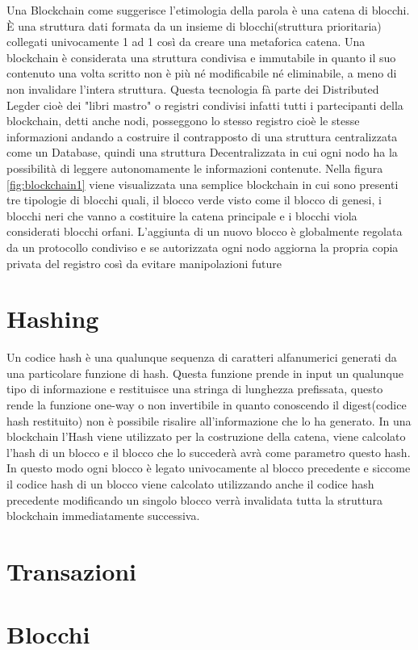 \documentclass[a4paper]{report}
\begin{document}
Una Blockchain come suggerisce l'etimologia della parola è una catena di blocchi. È una struttura dati formata da un insieme di blocchi(struttura prioritaria) collegati univocamente 1 ad 1 così da creare una metaforica catena. Una blockchain è considerata una struttura condivisa e immutabile in quanto il suo contenuto una volta scritto non è più né modificabile né eliminabile, a meno di non invalidare l'intera struttura. Questa tecnologia fà parte dei Distributed Legder cioè dei "libri mastro" o registri condivisi infatti tutti i partecipanti della blockchain, detti anche nodi, posseggono lo stesso registro cioè le stesse informazioni andando a costruire il contrapposto di una struttura centralizzata come un Database, quindi una struttura Decentralizzata in cui ogni nodo ha la possibilità di leggere autonomamente le informazioni contenute.
Nella figura \ref{fig:blockchain1} viene visualizzata una semplice blockchain in cui sono presenti tre tipologie di blocchi quali, il blocco verde visto come il blocco di genesi, i blocchi neri che vanno a costituire la catena principale e i blocchi viola considerati blocchi orfani. L'aggiunta di un nuovo blocco è globalmente regolata da un protocollo condiviso e se autorizzata ogni nodo aggiorna la propria copia privata del registro così da evitare manipolazioni future
\section{Hashing}
Un codice hash è una qualunque sequenza di caratteri alfanumerici generati da una particolare funzione di hash. Questa funzione prende in input un qualunque tipo di informazione e restituisce una stringa di lunghezza prefissata, questo rende la funzione one-way o non invertibile in quanto conoscendo il digest(codice hash restituito) non è possibile risalire all'informazione che lo ha generato. In una blockchain l'Hash viene utilizzato per la costruzione della catena, viene calcolato l'hash di un blocco e il blocco che lo succederà avrà come parametro questo hash. In questo modo ogni blocco è legato univocamente al blocco precedente e siccome il codice hash di un blocco viene calcolato utilizzando anche il codice hash precedente modificando un singolo blocco verrà invalidata tutta la struttura blockchain immediatamente successiva.
\section{Transazioni}
\section{Blocchi}
\end{document}
